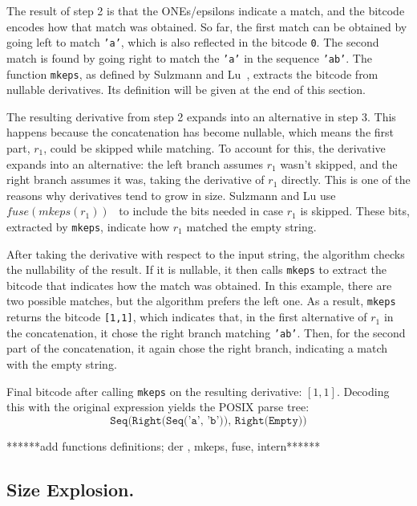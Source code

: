 \documentclass[12pt]{article}
\begin{document}
The result of step 2 is that the ONEs/epsilons indicate a match, and the bitcode encodes how that match was obtained. So far, 
the first match can be obtained by going left to match \texttt{'a'}, which is also reflected in the bitcode \texttt{0}. 
The second match is found by going right to match the \texttt{'a'} in the sequence \texttt{'ab'}. The function \texttt{mkeps},
as defined by Sulzmann and Lu~\cite{Sulzmann2014}, extracts the bitcode from nullable derivatives. Its definition will be given
at the end of this section.


The resulting derivative from step 2 expands into an alternative in step 3. This happens because the concatenation has become 
nullable, which means the first part, $ r_1 $, could be skipped while matching. To account for this, the derivative expands into
an alternative: the left branch assumes $ r_1 $ wasn’t skipped, and the right branch assumes it was, taking the derivative of 
$ r_1 $ directly. This is one of the reasons why derivatives tend to grow in size. Sulzmann and Lu use $fuse(mkeps(r_1))$~\cite{Sulzmann2014} 
to include the bits needed in case \( r_1 \) is skipped. These bits, extracted by \texttt{mkeps}, indicate how \( r_1 \) matched the empty string.

    
After taking the derivative with respect to the input string, the algorithm checks the nullability of the result. If it is nullable,
it then calls \texttt{mkeps} to extract the bitcode that indicates how the match was obtained. In this example, there are two possible
matches, but the algorithm prefers the left one. As a result, \texttt{mkeps} returns the bitcode \texttt{[1,1]}, which indicates that,
in the first alternative of $r_1$ in the concatenation, it chose the right branch matching \texttt{'ab'}. Then, for the second part of
the concatenation, it again chose the right branch, indicating a match with the empty string.

Final bitcode after calling \texttt{mkeps} on the resulting derivative: \([1, 1]\). Decoding this with the original expression yields 
the POSIX parse tree:
\[
\texttt{Seq(Right(Seq('a', 'b')), Right(Empty))}
\]

******add functions definitions; der , mkeps, fuse, intern******
\subsection{Size Explosion.} %
\end{document}

